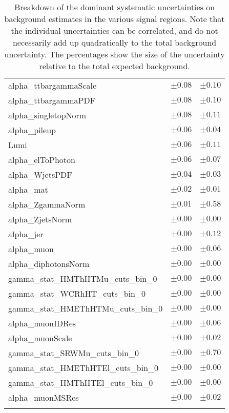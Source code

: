 \begin{table}
\begin{center}
\begin{tabular*}{\textwidth}{@{\extracolsep{\fill}}lcc}
alpha\_ttbargammaScale         & $\pm 0.08$          & $\pm 0.10$       \\
alpha\_ttbargammaPDF         & $\pm 0.08$          & $\pm 0.10$       \\
alpha\_singletopNorm         & $\pm 0.08$          & $\pm 0.11$       \\
alpha\_pileup         & $\pm 0.06$          & $\pm 0.04$       \\
Lumi         & $\pm 0.06$          & $\pm 0.11$       \\
alpha\_elToPhoton         & $\pm 0.06$          & $\pm 0.07$       \\
alpha\_WjetsPDF         & $\pm 0.04$          & $\pm 0.03$       \\
alpha\_mat         & $\pm 0.02$          & $\pm 0.01$       \\
alpha\_ZgammaNorm         & $\pm 0.01$          & $\pm 0.58$       \\
alpha\_ZjetsNorm         & $\pm 0.00$          & $\pm 0.00$       \\
alpha\_jer         & $\pm 0.00$          & $\pm 0.12$       \\
alpha\_muon         & $\pm 0.00$          & $\pm 0.06$       \\
alpha\_diphotonsNorm         & $\pm 0.00$          & $\pm 0.00$       \\
gamma\_stat\_HMThHTMu\_cuts\_bin\_0         & $\pm 0.00$          & $\pm 0.00$       \\
gamma\_stat\_WCRhHT\_cuts\_bin\_0         & $\pm 0.00$          & $\pm 0.00$       \\
gamma\_stat\_HMEThHTMu\_cuts\_bin\_0         & $\pm 0.00$          & $\pm 0.00$       \\
alpha\_muonIDRes         & $\pm 0.00$          & $\pm 0.06$       \\
alpha\_muonScale         & $\pm 0.00$          & $\pm 0.02$       \\
gamma\_stat\_SRWMu\_cuts\_bin\_0         & $\pm 0.00$          & $\pm 0.70$       \\
gamma\_stat\_HMEThHTEl\_cuts\_bin\_0         & $\pm 0.00$          & $\pm 0.00$       \\
gamma\_stat\_HMThHTEl\_cuts\_bin\_0         & $\pm 0.00$          & $\pm 0.00$       \\
alpha\_muonMSRes         & $\pm 0.00$          & $\pm 0.02$       \\
\noalign{\smallskip}\hline\noalign{\smallskip}
\end{tabular*}
\end{center}
\caption[Breakdown of uncertainty on background estimates]{
Breakdown of the dominant systematic uncertainties on background estimates in the various signal regions.
Note that the individual uncertainties can be correlated, and do not necessarily add up quadratically to 
the total background uncertainty. The percentages show the size of the uncertainty relative to the total expected background.
\label{table.results.bkgestimate.uncertainties.SRWEl_SRWMu}}
\end{table}
%